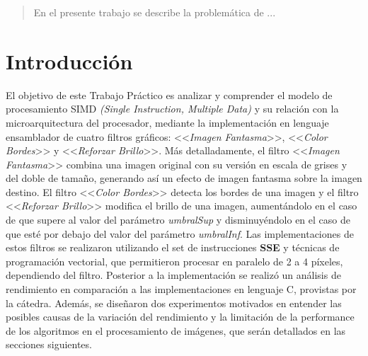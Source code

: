 \documentclass[a4paper]{article}
\begin{document}
\thispagestyle{empty}

\maketitle
\newpage

\thispagestyle{empty}
\vfill
\begin{abstract}
En el presente trabajo se describe la problemática de ...
\end{abstract}

\thispagestyle{empty}
\vspace{3cm}
\tableofcontents
\newpage


\newpage

\section{Introducción}

\justify
El objetivo de este Trabajo Práctico es analizar y comprender el modelo de procesamiento SIMD \textit{(Single Instruction, Multiple Data)} y su relación con la microarquitectura del procesador, mediante la implementación en lenguaje ensamblador de cuatro filtros gráficos: <<\textit{Imagen Fantasma}>>, <<\textit{Color Bordes}>> y <<\textit{Reforzar Brillo}>>. 
\justify
Más detalladamente, el filtro <<\textit{Imagen Fantasma}>> combina una imagen original con su versión en escala de grises y del doble de tamaño, generando así un  efecto de imagen fantasma sobre la imagen destino. El filtro <<\textit{Color Bordes}>> detecta los bordes de una  imagen y el filtro <<\textit{Reforzar Brillo}>> modifica el brillo de una imagen, aumentándolo en el caso de que  supere al valor del parámetro \textit{umbralSup} y disminuyéndolo en el caso de que esté por debajo del valor  del parámetro \textit{umbralInf}.
\justify
\indent Las implementaciones de estos filtros se realizaron utilizando el set de instrucciones \textbf{SSE} y técnicas de programación vectorial, que permitieron procesar en paralelo de 2 a 4 píxeles, dependiendo del filtro. Posterior a la implementación se realizó un análisis de rendimiento en comparación a las implementaciones en lenguaje C, provistas por la cátedra. Además, se diseñaron dos experimentos motivados en entender las posibles causas de la variación del rendimiento y la limitación de la performance de los algoritmos en el procesamiento de imágenes, que serán detallados en las secciones siguientes.  
\end{document}
